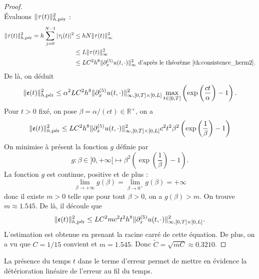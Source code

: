 \begin{proof}
\begin{equation}
\end{equation}
Évaluons $\| \tau(t) \|_{h,\per}^2$ :
\begin{align*}
\|\mathfrak{\tau}(t)\|_{h,\per}^2 = h \gsum_{j=0}^{N-1} |\mathfrak{\tau_j}(t)|^2 & \leq h N \|\mathfrak{\tau}(t)\|_{\infty}^2 \\
	& \leq  L \|\mathfrak{\tau}(t)\|_{\infty}^2 \\
	& \leq L C^2 h^8  \| \partial_x^{(5)} u(t,\cdot) \|_{\infty}^2 \text{ d'après le théorème \ref{th:consistence_herm2}.}
\end{align*}
De là, on déduit
\begin{equation}
\|\mathfrak{e}(t)\|_{h,\per}^2 \leq \alpha^2 L C^2 h^8  \| \partial_x^{(5)} u(t,\cdot) \|_{\infty,[0,T] \times [0,L]}^2 \max_{t \in [0,T]} \left( \exp \left( \dfrac{ct}{\alpha} \right) -1  \right).
\end{equation}
Pour $t>0$ fixé, on pose $\beta = \alpha/(ct) \in \mathbb{R}^+$, on a 
\begin{equation}
\|\mathfrak{e}(t)\|_{h,\per}^2 \leq L C^2 h^8  \| \partial_x^{(5)} u(t,\cdot) \|_{\infty,[0,T] \times [0,L]}^2 c^2 t^2 \beta^2 \left( \exp \left( \dfrac{1}{\beta} \right) -1  \right)
\end{equation}
On minimise à présent la fonction $g$ définie par
\begin{equation}
g :\beta \in ]0 , + \infty[ \mapsto \beta^2 \left( \exp \left( \dfrac{1}{\beta} \right) -1  \right).
\end{equation}
La fonction $g$ est continue, positive et de plus :
\begin{equation}
\lim_{\beta \rightarrow + \infty} g(\beta) = \lim_{\beta \rightarrow 0^+} g(\beta) = + \infty
\end{equation}
donc il existe $m > 0$ telle que pour tout $\beta > 0$, on a $g(\beta)>m$. On trouve $m \approx 1.545$. De là, il découle que
\begin{equation*}
\|\mathfrak{e}(t)\|_{h,\per}^2 \leq L C^2 m c^2 t^2 h^8  \| \partial_x^{(5)} u(t,\cdot) \|_{\infty,[0,T] \times [0,L]}^2.
\end{equation*}
L'estimation est obtenue en prenant la racine carré de cette équation. De plus, on a vu que $C = 1/15$ convient et $m=1.545$. Donc $\tilde{C} = \sqrt{mC} \approx 0.3210$.
\end{proof}

La présence du temps $t$ dans le terme d'erreur permet de mettre en évidence la détérioration linéaire de l'erreur au fil du temps. 

